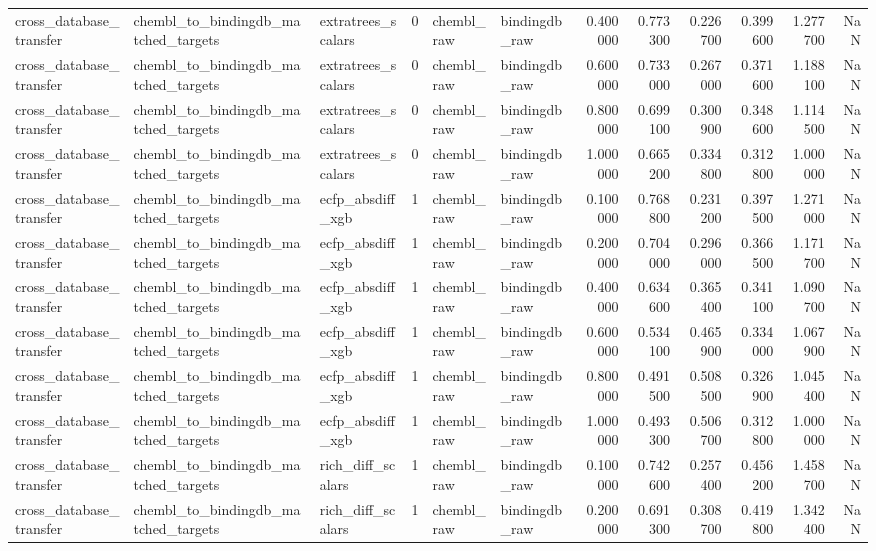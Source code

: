 \begin{longtable}{lllrllrrrrrr}
cross\_database\_transfer & chembl\_to\_bindingdb\_matched\_targets & extratrees\_scalars & 0 & chembl\_raw & bindingdb\_raw & 0.400000 & 0.773300 & 0.226700 & 0.399600 & 1.277700 & NaN \\
cross\_database\_transfer & chembl\_to\_bindingdb\_matched\_targets & extratrees\_scalars & 0 & chembl\_raw & bindingdb\_raw & 0.600000 & 0.733000 & 0.267000 & 0.371600 & 1.188100 & NaN \\
cross\_database\_transfer & chembl\_to\_bindingdb\_matched\_targets & extratrees\_scalars & 0 & chembl\_raw & bindingdb\_raw & 0.800000 & 0.699100 & 0.300900 & 0.348600 & 1.114500 & NaN \\
cross\_database\_transfer & chembl\_to\_bindingdb\_matched\_targets & extratrees\_scalars & 0 & chembl\_raw & bindingdb\_raw & 1.000000 & 0.665200 & 0.334800 & 0.312800 & 1.000000 & NaN \\
cross\_database\_transfer & chembl\_to\_bindingdb\_matched\_targets & ecfp\_absdiff\_xgb & 1 & chembl\_raw & bindingdb\_raw & 0.100000 & 0.768800 & 0.231200 & 0.397500 & 1.271000 & NaN \\
cross\_database\_transfer & chembl\_to\_bindingdb\_matched\_targets & ecfp\_absdiff\_xgb & 1 & chembl\_raw & bindingdb\_raw & 0.200000 & 0.704000 & 0.296000 & 0.366500 & 1.171700 & NaN \\
cross\_database\_transfer & chembl\_to\_bindingdb\_matched\_targets & ecfp\_absdiff\_xgb & 1 & chembl\_raw & bindingdb\_raw & 0.400000 & 0.634600 & 0.365400 & 0.341100 & 1.090700 & NaN \\
cross\_database\_transfer & chembl\_to\_bindingdb\_matched\_targets & ecfp\_absdiff\_xgb & 1 & chembl\_raw & bindingdb\_raw & 0.600000 & 0.534100 & 0.465900 & 0.334000 & 1.067900 & NaN \\
cross\_database\_transfer & chembl\_to\_bindingdb\_matched\_targets & ecfp\_absdiff\_xgb & 1 & chembl\_raw & bindingdb\_raw & 0.800000 & 0.491500 & 0.508500 & 0.326900 & 1.045400 & NaN \\
cross\_database\_transfer & chembl\_to\_bindingdb\_matched\_targets & ecfp\_absdiff\_xgb & 1 & chembl\_raw & bindingdb\_raw & 1.000000 & 0.493300 & 0.506700 & 0.312800 & 1.000000 & NaN \\
cross\_database\_transfer & chembl\_to\_bindingdb\_matched\_targets & rich\_diff\_scalars & 1 & chembl\_raw & bindingdb\_raw & 0.100000 & 0.742600 & 0.257400 & 0.456200 & 1.458700 & NaN \\
cross\_database\_transfer & chembl\_to\_bindingdb\_matched\_targets & rich\_diff\_scalars & 1 & chembl\_raw & bindingdb\_raw & 0.200000 & 0.691300 & 0.308700 & 0.419800 & 1.342400 & NaN \\

\end{longtable}
